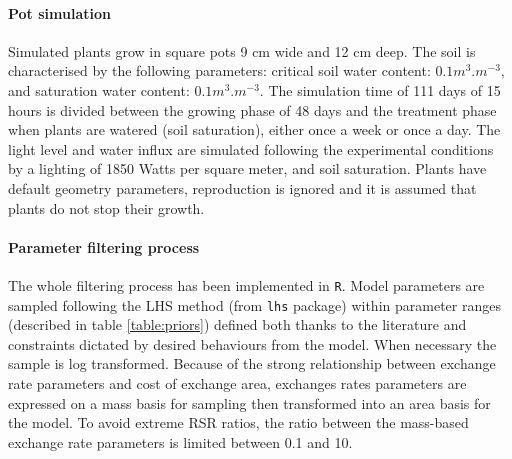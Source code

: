 \paragraph{Pot simulation}
Simulated plants grow in square pots 9 cm wide and 12 cm deep. The soil is characterised by the following parameters: critical soil water content: $0.1 m^3.m^{-3}$, and saturation water content: $0.1 m^3.m^{-3}$. The simulation time of 111 days of 15 hours is divided between the growing phase of 48 days and the treatment phase when plants are watered (soil saturation), either once a week or once a day. The light level and water influx are simulated following the experimental conditions \parencite{peterson_growth_1982} by a lighting of 1850 Watts per square meter, and soil saturation. Plants have default geometry parameters,  reproduction is ignored and it is assumed that plants do not stop their growth.

\paragraph{Parameter filtering process}
The whole filtering process has been implemented in \texttt{R}. Model parameters are sampled following the LHS method (from \texttt{lhs} package) within parameter ranges (described in table \ref{table:priors}) defined both thanks to the literature and constraints dictated by desired behaviours from the model. When necessary the sample is log transformed. Because of the strong relationship between exchange rate parameters and cost of exchange area, exchanges rates parameters are expressed on a mass basis for sampling then transformed into an area basis for the model. To avoid extreme RSR ratios, the ratio between the mass-based exchange rate parameters is limited between 0.1 and 10.


